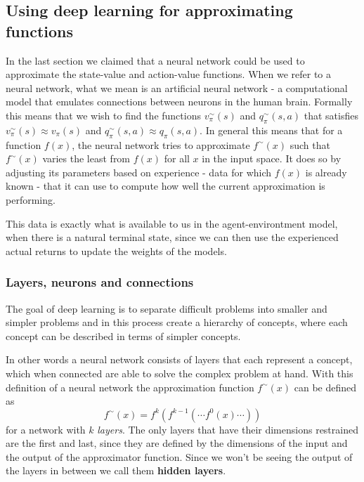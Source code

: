 \documentclass[11pt]{article}
\begin{document}
\maketitle

\subsection{Using deep learning for approximating functions}

In the last section we claimed that a neural network could be used to approximate the
state-value and action-value functions.
When we refer to a neural network, what we mean is an artificial neural network -
a computational model that emulates connections between neurons in the human brain.
Formally this means that we wish to find the functions $v_\pi^{\sim}(s)$ and $q_\pi^{\sim}(s,a)$ that
satisfies $v_\pi^{\sim}(s) \approx v_\pi(s)$ and $q_\pi^{\sim}(s,a) \approx q_\pi(s, a)$.
In general this means that for a function $f(x)$, the neural network tries to approximate
$f^{\sim}(x)$ such that $f^{\sim}(x)$ varies the least from $f(x)$ for all $x$ in the input
space\cite{DeepLearningBook}.
It does so by adjusting its parameters based on experience - data for which $f(x)$ is already known -
that it can use to compute how well the current approximation is performing.

This data is exactly what is available to us in the agent-environtment model, when there is a natural terminal state,
since we can then use the experienced actual returns to update the weights of the models.

\subsubsection{Layers, neurons and connections}

The goal of deep learning is to separate difficult problems into smaller and simpler problems
and in this process create a hierarchy of concepts, where each concept can be described in terms
of simpler concepts\cite{DeepLearningBook}.

In other words a neural network consists of layers that each represent a concept, which
when connected are able to solve the complex problem at hand.
With this definition of a neural network the approximation function $f^{\sim}(x)$ can be
defined as
\begin{equation}
    f^{\sim}(x) = f^{k}(f^{k-1}( \cdots f^{0}(x) \cdots))
\end{equation}
for a network with $k$ \textit{layers}.
The only layers that have their dimensions restrained are the first and last, since they are defined by the
dimensions of the input and the output of the approximator function.
Since we won't be seeing the output of the layers in between we call them \textbf{hidden layers}.
\end{document}
